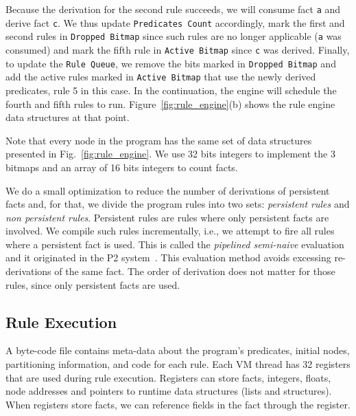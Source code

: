 Because the derivation for the second rule succeeds, we will consume
fact \texttt{a} and derive fact \texttt{c}. We thus update
\texttt{Predicates Count} accordingly, mark the first 
and second rules in \texttt{Dropped Bitmap} since such rules are no
longer applicable (\texttt{a} was consumed) and mark the fifth rule
in \texttt{Active Bitmap} since \texttt{c} was derived. Finally, to
update the \texttt{Rule Queue}, we remove the bits marked
in \texttt{Dropped Bitmap} and add the active rules marked
in \texttt{Active Bitmap} that use the newly derived predicates, rule
5 in this case. In the continuation, the engine will schedule the
fourth and fifth rules to run. Figure~\ref{fig:rule_engine}(b) shows
the rule engine data structures at that point.

Note that every node in the program has the same set of data
structures presented in Fig.~\ref{fig:rule_engine}. We use 32 bits
integers to implement the 3 bitmaps and an array of 16 bits integers to
count facts.

We do a small optimization to reduce the number of derivations of
persistent facts and, for that, we divide the program rules into two
sets: \emph{persistent rules} and \emph{non persistent rules}.
Persistent rules are rules where only persistent facts are
involved. We compile such rules incrementally, i.e., we attempt to
fire all rules where a persistent fact is used. This is called
the \emph{pipelined semi-naive} evaluation and it originated in the P2
system~\cite{Loo-condie-garofalakis-p2}. This evaluation method avoids
excessing re-derivations of the same fact. The order of derivation
does not matter for those rules, since only persistent facts are used.


\subsection{Rule Execution}

A byte-code file contains meta-data about the program's predicates,
initial nodes, partitioning information, and code for each rule. Each
VM thread has 32 registers that are used during rule
execution. Registers can store facts, integers, floats, node addresses
and pointers to runtime data structures (lists and structures). When
registers store facts, we can reference fields in the fact through the
register.

